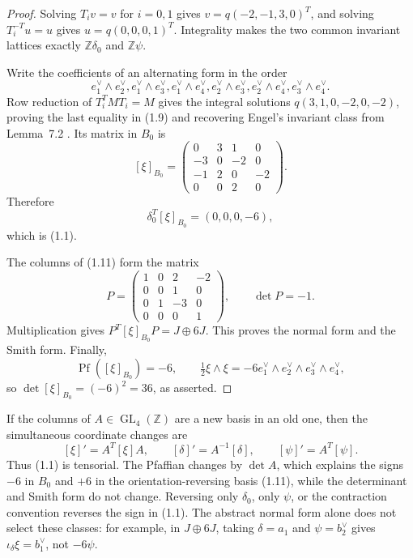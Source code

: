 \documentclass[11pt]{article}
\numberwithin{equation}{section}
\begin{document}
\begin{proof}
Solving $T_iv=v$ for $i=0,1$ gives
$v=q(-2,-1,3,0)^T$, and solving $T_i^{-T}u=u$ gives
$u=q(0,0,0,1)^T$.  Integrality makes the two common invariant lattices
exactly $\mathbb Z\delta_0$ and $\mathbb Z\psi$.

Write the coefficients of an alternating form in the order
\[
 e_1^\vee\wedge e_2^\vee, e_1^\vee\wedge e_3^\vee,
 e_1^\vee\wedge e_4^\vee, e_2^\vee\wedge e_3^\vee,
 e_2^\vee\wedge e_4^\vee, e_3^\vee\wedge e_4^\vee.
\]
Row reduction of $T_i^TMT_i=M$ gives the integral solutions
$q(3,1,0,-2,0,-2)$, proving the last equality in (1.9) and recovering
Engel's invariant class from Lemma~7.2 \cite[p.~17]{Engel}.  Its matrix in
$B_0$ is
\[
 [\xi]_{B_0}=
 \begin{pmatrix}
 0&3&1&0\\-3&0&-2&0\\-1&2&0&-2\\0&0&2&0
 \end{pmatrix}.                                                   \tag{1.14}
\]
Therefore
\[
       \delta_0^T[\xi]_{B_0}=(0,0,0,-6),
\]
which is (1.1).

The columns of (1.11) form the matrix
\[
 P=\begin{pmatrix}1&0&2&-2\\0&0&1&0\\0&1&-3&0\\0&0&0&1\end{pmatrix},
 \qquad \det P=-1.
\]
Multiplication gives $P^T[\xi]_{B_0}P=J\oplus6J$.  This proves the
normal form and the Smith form.  Finally,
\[
 \operatorname{Pf}([\xi]_{B_0})=-6,\qquad
 \tfrac12\xi\wedge\xi
   =-6e_1^\vee\wedge e_2^\vee\wedge e_3^\vee\wedge e_4^\vee,
\]
so $\det[\xi]_{B_0}=(-6)^2=36$, as asserted.
\end{proof}

\begin{remark}
If the columns of $A\in\operatorname{GL}_4(\mathbb Z)$ are a new basis in
an old one, then the simultaneous coordinate changes are
\[
 [\xi]'=A^T[\xi]A,\qquad [\delta]'=A^{-1}[\delta],\qquad
 [\psi]'=A^T[\psi].                                               \tag{1.15}
\]
Thus (1.1) is tensorial.  The Pfaffian changes by $\det A$, which explains
the signs $-6$ in $B_0$ and $+6$ in the orientation-reversing basis
(1.11), while the determinant and Smith form do not change.  Reversing only
$\delta_0$, only $\psi$, or the contraction convention reverses the sign in
(1.1).  The abstract normal form alone does not select these classes: for
example, in $J\oplus6J$, taking $\delta=a_1$ and $\psi=b_2^\vee$ gives
$\iota_\delta\xi=b_1^\vee$, not $-6\psi$.
\end{remark}
\end{document}
